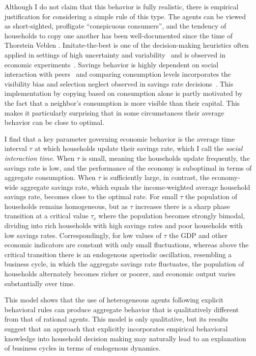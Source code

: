 Although I do not claim that this behavior is fully realistic, there is empirical justification for considering a simple rule of this type.  The agents can be viewed as short-sighted, profligate ``conspicuous consumers'', and the tendency of households to copy one another has been well-documented since the time of Thorstein Veblen \citep{veblen1899}.  Imitate-the-best is one of the decision-making heuristics often applied in settings of high uncertainty and variability~\citep{Gigerenzer2011} and is observed in economic experiments~\citep{Traulsen2010}.  Savings behavior is highly dependent on social interaction with peers~\citep{Lu2011,Zhang2018,Kaustia2012, cascades} and comparing consumption levels incorporates the visibility bias and selection neglect observed in savings rate decisions~\citep{enke2015you}.  This implementation by copying based on consumption alone is partly motivated by the fact that a neighbor's consumption is more visible than their capital.    This makes it particularly surprising that in some circumstances their average behavior can be close to optimal.

I find that a key parameter governing economic behavior is the average time interval $\tau$ at which households update their savings rate, which I call the \textit{social interaction time}.  When $\tau$ is small, meaning the households update frequently, the savings rate is low, and the performance of the economy is suboptimal in terms of aggregate consumption. When $\tau$ is sufficiently large, in contrast, the economy-wide aggregate savings rate, which equals the income-weighted average household savings rate, becomes close to the optimal rate.  For small $\tau$ the population of households remains homogeneous, but as $\tau$ increases there is a sharp phase transition at a critical value $\tau_{c}$ where the population becomes strongly bimodal, dividing into rich households with high savings rates and poor households with low savings rates.  Correspondingly, for low values of $\tau$ the GDP and other economic indicators are constant with only small fluctuations, whereas above the critical transition there is an endogenous aperiodic oscillation, resembling a business cycle, in which the aggregate savings rate fluctuates, the population of households alternately becomes richer or poorer, and economic output varies substantially over time.  

This model shows that the use of heterogeneous agents following explicit behavioral rules can produce aggregate behavior that is qualitatively different from that of rational agents. This model is only qualitative, but its results suggest that an approach that explicitly incorporates empirical behavioral knowledge into household decision making may naturally lead to an explanation of business cycles in terms of endogenous dynamics. 

